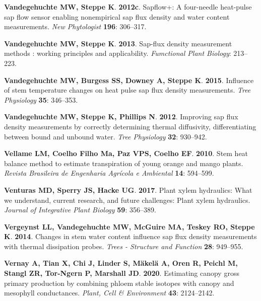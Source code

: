 \documentclass[11pt,twoside]{reedthesis}
\begin{document}
\hypertarget{ref-Vandegehuchte2012c}{}
\textbf{\textnormal{Vandegehuchte MW}, \textnormal{Steppe K}}.
\textbf{2012c}. Sapflow+: A four-needle heat-pulse sap flow sensor
enabling nonempirical sap flux density and water content measurements.
\emph{New Phytologist} \textbf{196}: 306--317.

\hypertarget{ref-Vandegehuchte2013}{}
\textbf{\textnormal{Vandegehuchte MW}, \textnormal{Steppe K}}.
\textbf{2013}. Sap-flux density measurement methods : working principles
and applicability. \emph{Fumctional Plant Biology}: 213--223.

\hypertarget{ref-Vandegehuchte2015}{}
\textbf{\textnormal{Vandegehuchte MW}, \textnormal{Burgess SS},
\textnormal{Downey A}, \textnormal{Steppe K}}. \textbf{2015}. Influence
of stem temperature changes on heat pulse sap flux density measurements.
\emph{Tree Physiology} \textbf{35}: 346--353.

\hypertarget{ref-Vandegehuchte2012b}{}
\textbf{\textnormal{Vandegehuchte MW}, \textnormal{Steppe K},
\textnormal{Phillips N}}. \textbf{2012}. Improving sap flux density
measurements by correctly determining thermal diffusivity,
differentiating between bound and unbound water. \emph{Tree Physiology}
\textbf{32}: 930--942.

\hypertarget{ref-Vellame2010}{}
\textbf{\textnormal{Vellame LM}, \textnormal{Coelho Filho Ma},
\textnormal{Paz VPS}, \textnormal{Coelho EF}}. \textbf{2010}. Stem heat
balance method to estimate transpiration of young orange and mango
plants. \emph{Revista Brasileira de Engenharia Agrícola e Ambiental}
\textbf{14}: 594--599.

\hypertarget{ref-venturas_plant_2017}{}
\textbf{\textnormal{Venturas MD}, \textnormal{Sperry JS},
\textnormal{Hacke UG}}. \textbf{2017}. Plant xylem hydraulics: What we
understand, current research, and future challenges: Plant xylem
hydraulics. \emph{Journal of Integrative Plant Biology} \textbf{59}:
356--389.

\hypertarget{ref-Vergeynst2014}{}
\textbf{\textnormal{Vergeynst LL}, \textnormal{Vandegehuchte MW},
\textnormal{McGuire MA}, \textnormal{Teskey RO}, \textnormal{Steppe K}}.
\textbf{2014}. Changes in stem water content influence sap flux density
measurements with thermal dissipation probes. \emph{Trees - Structure
and Function} \textbf{28}: 949--955.

\hypertarget{ref-Vernay2020}{}
\textbf{\textnormal{Vernay A}, \textnormal{Tian X}, \textnormal{Chi J},
\textnormal{Linder S}, \textnormal{Mäkelä A}, \textnormal{Oren R},
\textnormal{Peichl M}, \textnormal{Stangl ZR}, \textnormal{Tor-Ngern P},
\textnormal{Marshall JD}}. \textbf{2020}. Estimating canopy gross
primary production by combining phloem stable isotopes with canopy and
mesophyll conductances. \emph{Plant, Cell \& Environment} \textbf{43}:
2124--2142.
\end{document}

